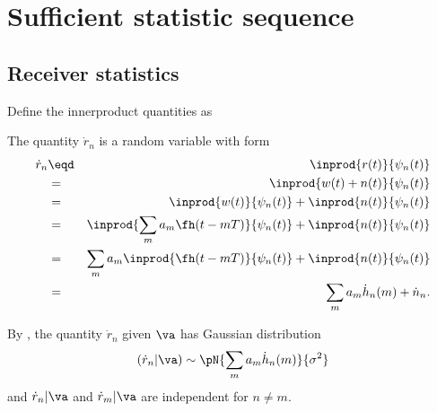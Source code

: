 \section{Sufficient statistic sequence}
\label{sec:fd_ml}
\subsection{Receiver statistics}
Define the innerproduct quantities as

The quantity $\dot{r}_n$ is a random variable with form
\begin{eqnarray*}
   \dot{r}_n
     &\eqd& \inprod{r(t)}{\psi_n(t)} 
   \\&=&    \inprod{w(t)+n(t)}{\psi_n(t)} 
   \\&=&    \inprod{w(t)}{\psi_n(t)} + \inprod{n(t)}{\psi_n(t)} 
   \\&=&    \inprod{\sum_m a_m \fh(t-mT)}{\psi_n(t)} + \inprod{n(t)}{\psi_n(t)} 
   \\&=&    \sum_m a_m \inprod{\fh(t-mT)}{\psi_n(t)} + \inprod{n(t)}{\psi_n(t)} 
   \\&=&    \sum_m a_m \dot{h}_n(m) + \dot{n}_n.
\end{eqnarray*}

By ,
the quantity $\dot{r}_n$ given $\va $ has Gaussian distribution
\[
   (\dot{r}_n|\va ) \sim \pN{\sum_m a_m \dot{h}_n(m)}{\sigma^2}
\]
and $\dot{r}_n|\va $ and $\dot{r}_m|\va $ are independent for $n\ne m$.


